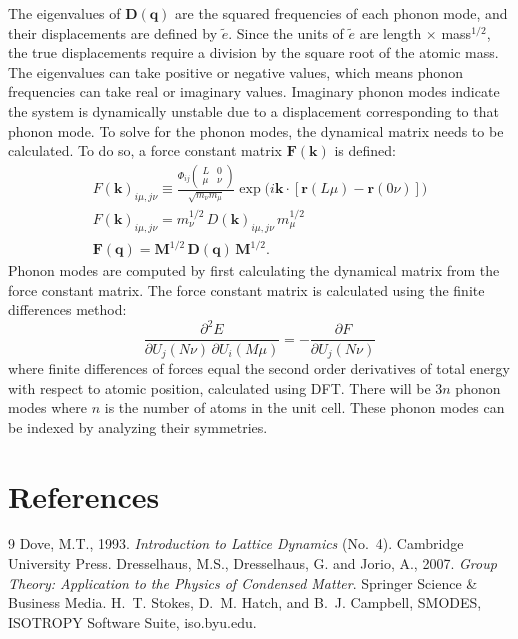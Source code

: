 \documentclass[11pt]{article}
\numberwithin{equation}{section}
\newcommand{\idx}[2]{\begin{pmatrix}#1\\#2\end{pmatrix}}
\begin{document}
The eigenvalues of $\mathbf{D}(\mathbf{q})$ are the squared frequencies of
each phonon mode, and their displacements are defined by $\tilde{e}$. Since
the units of $\tilde{e}$ are length $\times$ mass$^{1/2}$, the true
displacements require a division by the square root of the atomic mass. The
eigenvalues can take positive or negative values, which means phonon
frequencies can take real or imaginary values. Imaginary phonon modes
indicate the system is dynamically unstable due to a displacement
corresponding to that phonon mode. To solve for the phonon modes, the
dynamical matrix needs to be calculated. To do so, a force constant matrix
$\mathbf{F}(\mathbf{k})$ is defined:
\begin{gather}
F(\mathbf{k})_{i\mu,j\nu} \equiv
\frac{\Phi_{ij}\idx{L & 0}{\mu & \nu}}{\sqrt{m_\nu m_\mu}}
\exp\!\big(i\mathbf{k}\cdot[\mathbf{r}(L\mu) - \mathbf{r}(0\nu)]\big) \\
F(\mathbf{k})_{i\mu,j\nu} = m_\nu^{1/2}\,D(\mathbf{k})_{i\mu,j\nu}\,m_\mu^{1/2} \\
\mathbf{F}(\mathbf{q}) = \mathbf{M}^{1/2}\,\mathbf{D}(\mathbf{q})\,\mathbf{M}^{1/2}.
\end{gather}
Phonon modes are computed by first calculating the dynamical matrix from the
force constant matrix. The force constant matrix is calculated using the
finite differences method:
\begin{equation}
\frac{\partial^2 E}{\partial U_j(N\nu)\,\partial U_i(M\mu)} = -\frac{\partial F}{\partial U_j(N\nu)}
\end{equation}
where finite differences of forces equal the second order derivatives of
total energy with respect to atomic position, calculated using DFT. There
will be $3n$ phonon modes where $n$ is the number of atoms in the unit cell.
These phonon modes can be indexed by analyzing their symmetries.

\section{References}

\renewcommand{\refname}{}
\vspace{-3em}
\begin{thebibliography}{9}
 Dove, M.T., 1993. \emph{Introduction to Lattice Dynamics}
  (No.~4). Cambridge University Press.
 Dresselhaus, M.S., Dresselhaus, G. and Jorio, A., 2007.
  \emph{Group Theory: Application to the Physics of Condensed Matter}.
  Springer Science \& Business Media.
 H.~T. Stokes, D.~M. Hatch, and B.~J. Campbell, SMODES,
  ISOTROPY Software Suite, iso.byu.edu.
\end{thebibliography}
\end{document}
